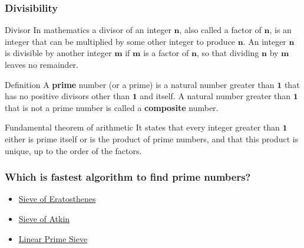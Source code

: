 \documentclass{beamer}
\begin{document}
\begin{frame}
\frametitle{Divisibility}
\begin{block}{Divisor}
In mathematics a divisor of an integer $\mathbf{n}$, also called a factor of $\mathbf{n}$, is an integer that can be multiplied by some other integer to produce $\mathbf{n}$. An integer $\mathbf{n}$ is divisible by another integer $\mathbf{m}$ if $\mathbf{m}$ is a factor of $\mathbf{n}$, so that dividing $\mathbf{n}$ by $\mathbf{m}$ leaves no remainder. 
\end{block}
\begin{block}{Definition}
A \textbf{prime} number (or a prime) is a natural number greater than $\mathbf{1}$ that has no positive divisors other than $\mathbf{1}$ and itself. A natural number greater than $\mathbf{1}$ that is not a prime number is called a \textbf{composite} number. 
\end{block}
\begin{block}{Fundamental theorem of arithmetic}
It states that every integer greater than $\mathbf{1}$ either is prime itself or is the product of prime numbers, and that this product is unique, up to the order of the factors.
\end{block}
\end{frame}

\begin{frame}
\frametitle{Which is fastest algorithm to find prime numbers?}
\begin{itemize}
 \item \href{https://en.wikipedia.org/wiki/Sieve_of_Eratosthenes}{Sieve of Eratosthenes}
 \item \href{https://en.wikipedia.org/wiki/Sieve_of_Atkin}{Sieve of Atkin}
 \item \href{http://e-maxx.ru/algo/prime_sieve_linear}{Linear Prime Sieve}
\end{itemize}
\end{frame}
\end{document}
